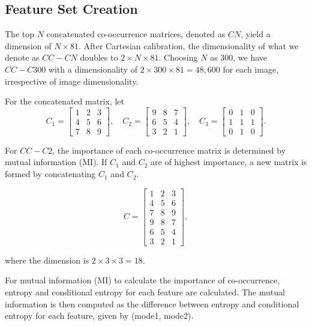 \subsection{Feature Set Creation}

The top $N$ concatenated co-occurrence matrices, denoted as $CN$, yield a dimension of $N \times 81$. After Cartesian calibration, the dimensionality of what we denote as $CC-CN$ doubles to $2 \times N \times 81$. Choosing $N$ as 300, we have $CC-C300$ with a dimensionality of $2 \times 300 \times 81 = 48,600$ for each image, irrespective of image dimensionality.

For the concatenated matrix, let
\[
    C_1 = \begin{bmatrix} 1 & 2 & 3 \\ 4 & 5 & 6 \\ 7 & 8 & 9 \end{bmatrix}, \quad
    C_2 = \begin{bmatrix} 9 & 8 & 7 \\ 6 & 5 & 4 \\ 3 & 2 & 1 \end{bmatrix}, \quad
    C_3 = \begin{bmatrix} 0 & 1 & 0 \\ 1 & 1 & 1 \\ 0 & 1 & 0 \end{bmatrix}.
\]

For $CC-C2$, the importance of each co-occurrence matrix is determined by mutual information (MI). If $C_1$ and $C_2$ are of highest importance, a new matrix is formed by concatenating $C_1$ and $C_2$.

\[
    C = \begin{bmatrix} 1 & 2 & 3 \\ 4 & 5 & 6 \\ 7 & 8 & 9 \\ 9 & 8 & 7 \\ 6 & 5 & 4 \\ 3 & 2 & 1 \end{bmatrix},
\]

where the dimension is $2 \times 3 \times 3 = 18$.

For mutual information (MI) to calculate the importance of co-occurrence, entropy and conditional entropy for each feature are calculated. The mutual information is then computed as the difference between entropy and conditional entropy for each feature, given by (mode1, mode2).\

